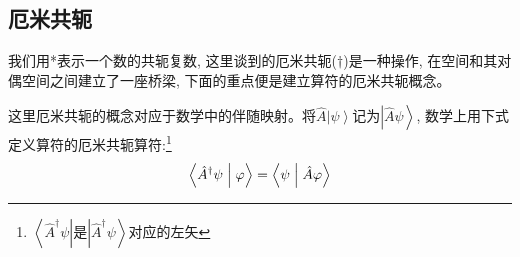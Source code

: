 \subsection*{厄米共轭}
我们用*表示一个数的共轭复数, 这里谈到的厄米共轭($\dagger$)是一种操作, 在空间和其对偶空间之间建立了一座桥梁, 下面的重点便是建立算符的厄米共轭概念。

这里厄米共轭的概念对应于数学中的伴随映射。将$\hat{A}\left|\psi\right\rangle$记为$\left|\hat{A}\psi\right\rangle$, 数学上用下式定义算符的厄米共轭算符:\footnote[1]{$\left\langle {{\hat A}^\dag }\psi  \right|$是$\left| \hat A^\dagger\psi  \right\rangle $对应的左矢}
\[\left\langle {{{{\hat A}^\dag }\psi }}\mathrel{\left | {\vphantom {{{{\hat A}^\dag }\psi } \varphi }}\right. \kern-\nulldelimiterspace}{\varphi } 
\right\rangle  = \left\langle {\psi }\mathrel{\left | {\vphantom {\psi  {\hat A\varphi }}}\right. \kern-\nulldelimiterspace}{{\hat A\varphi }} \right\rangle \]

